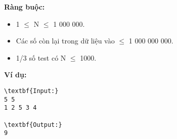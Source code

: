 \textbf{Ràng buộc:
}
\begin{itemize}
	\item 1  $\le$  N  $\le$  1 000 000.
	\item Các số còn lại trong dữ liệu vào  $\le$  1 000 000 000.
	\item 1/3 số test có N  $\le$  1000.
\end{itemize}
\textbf{Ví dụ:
}
\begin{verbatim}
\textbf{Input:}
5 5
1 2 5 3 4

\textbf{Output:}
9

\end{verbatim}